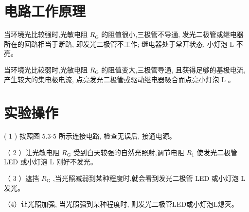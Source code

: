 \documentclass[10pt]{article}
\begin{document}
\begin{center}
\end{center}

\section*{电路工作原理}

当环境光比较强时,光敏电阻 \({R}_{\mathrm{G}}\) 的阻值很小,三极管不导通, 发光二极管或继电器所在的回路相当于断路, 即发光二极管不工作; 继电器处于常开状态, 小灯泡 L 不亮。

当环境光比较弱时,光敏电阻 \({R}_{\mathrm{G}}\) 的阻值变大,三极管导通, 且获得足够的基极电流, 产生较大的集电极电流, 点亮发光二极管或驱动继电器吸合而点亮小灯泡 \(\mathrm{L}\) 。

\section*{实验操作}

( 1 ) 按照图 5.3-5 所示连接电路, 检查无误后, 接通电源。

（ 2 ）让光敏电阻 \({R}_{\mathrm{G}}\) 受到白天较强的自然光照射,调节电阻 \({R}_{1}\) 使发光二极管 LED 或小灯泡 L 刚好不发光。

（ 3 ）遮挡 \({R}_{\mathrm{G}}\) ,当光照减弱到某种程度时,就会看到发光二极管 LED 或小灯泡 L 发光。

（4）让光照加强, 当光照强到某种程度时, 则发光二极管LED或小灯泡L熄灭。
\end{document}
